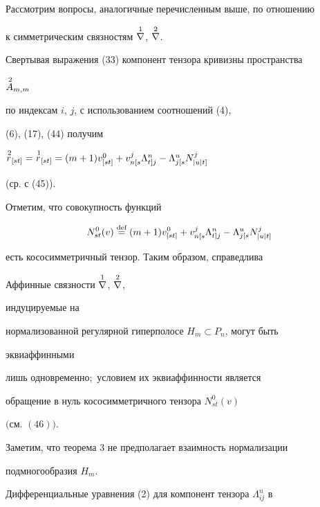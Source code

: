Рассмотрим вопросы, аналогичные перечисленным выше, по отношению 


к симметрическим связностям $\overset{1}{\nabla}{}$, $\overset{2}{\nabla}{}$. 


Свертывая выражения (33) компонент тензора кривизны пространства 


$\overset{\,2}{A}{}_{m,m}$ 


по индексам $i$, $j$, с использованием соотношений (4), 


(6), (17), (44) получим 


$\up{\,2}{r}_{[s t]}=\up{\,1}{r}_{[s t]}=\linebreak(m+1)v^0_{[s t]}+ 


v^j_{n[s}\Lambda^n_{t]j}-\Lambda^u_{j[s}N^j_{|u|t]}$ 


(ср. с (45)).  


Отметим, что совокупность функций 


\begin{equation} 


N^0_{s t}(v)\up{\text{def}}{=}(m+1)v^0_{[s t]}+ 


v^j_{n[s}\Lambda^n_{t]j}-\Lambda^u_{j[s}N^j_{|u|t]} 


\end{equation} 


есть кососимметричный тензор. Таким образом, справедлива 


 


\begin{thm} Аффинные связности $\overset{1}{\nabla}{}$, $\overset{2}{\nabla}{}$, 


индуцируемые на 


нормализованной регулярной гиперполосе $H_m\subset P_n$, могут быть 


эквиаффинными 


лишь одновременно$;$ условием их эквиаффинности является 


обращение в нуль кососимметричного тензора $N^0_{s t}(v)$ 


$($см. $(46))$. 


\end{thm} 


 


Заметим, что теорема 3 не предполагает взаимность нормализации 


подмногообразия $H_m$. 


 


Дифференциальные уравнения (2) для компонент тензора $\Lambda^n_{ij}$ в  


